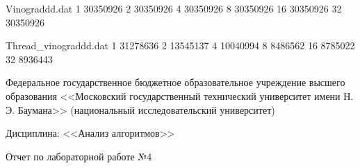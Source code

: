 \documentclass[a4paper,12pt]{article}
\begin{document}


\begin{filecontents}{Vinograddd.dat}
	1 30350926
	2 30350926
	4 30350926
	8 30350926
	16 30350926
	32 30350926
\end{filecontents}

\begin{filecontents}{Thread_vinograddd.dat}
	1 31278636
	2 13545137
	4 10040994
	8 8486562
	16 8785022
	32 8936443
\end{filecontents}



\large
\begin{center}
	Федеральное государственное бюджетное образовательное учреждение 
	высшего образования <<Московский государственный технический 
	университет имени Н. Э. Баумана>> 
	(национальный исследовательский университет)
\end{center}

\vspace*{30mm} 

\huge
\begin{center}
	Дисциплина: <<Анализ алгоритмов>>
	
	Отчет по лабораторной работе №4
\end{center}

\vspace*{30mm} 
\end{document}
